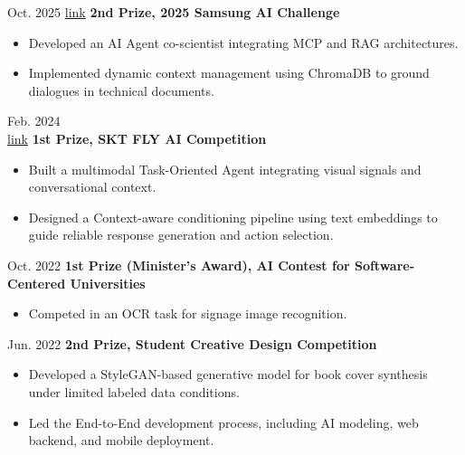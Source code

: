 \documentclass[10pt, letterpaper]{article}
\newenvironment{highlights}{
    \begin{itemize}[
        topsep=0.10 cm,
        parsep=0.10 cm,
        partopsep=0pt,
        itemsep=0pt,
        leftmargin=0.4 cm + 10pt
    ]
}{
    \end{itemize}
} %
\newenvironment{twocolentry_project}[2][]{
    \onecolentry
    \def\secondColumn{#2}
    \setcolumnwidth{\fill, 2.0 cm}
    \begin{paracol}{2}
}{
    \switchcolumn \raggedleft \secondColumn
    \end{paracol}
    \endonecolentry
} %
\let\hrefWithoutArrow\href
\renewcommand{\href}[2]{\hrefWithoutArrow{#1}{\ifthenelse{\equal{#2}{}}{ }{#2 }\raisebox{.15ex}{\footnotesize \faExternalLink*}}}
\begin{document}
    \begin{twocolentry_project}{
        Oct. 2025
        \hrefWithoutArrow{https://github.com/donguk071/AI-Coscientist}{\faLink link}
    }
        \textbf{2nd Prize, 2025 Samsung AI Challenge}
        \begin{highlights}
            \item Developed an AI Agent co-scientist integrating MCP and RAG architectures.
            \item Implemented dynamic context management using ChromaDB to ground dialogues in technical documents.
        \end{highlights}
    \end{twocolentry_project}

    \vspace{0.2 cm}

    \begin{twocolentry_project}{
        Feb. 2024\\
        \hrefWithoutArrow{https://github.com/donguk071/greedot}{\faLink link}
    }
        \textbf{1st Prize, SKT FLY AI Competition}
        \begin{highlights}
            \item Built a multimodal Task-Oriented Agent integrating visual signals and conversational context.
            \item Designed a Context-aware conditioning pipeline using text embeddings to guide reliable response generation and action selection.
        \end{highlights}
    \end{twocolentry_project}

    \vspace{0.2 cm}

    \begin{twocolentry_project}{
        Oct. 2022
    }
        \textbf{1st Prize (Minister’s Award), AI Contest for Software-Centered Universities}
        \begin{highlights}
            \item Competed in an OCR task for signage image recognition.
        \end{highlights}
    \end{twocolentry_project}

    \vspace{0.2 cm}
    \begin{twocolentry_project}{
        Jun. 2022
    }
        \textbf{2nd Prize, Student Creative Design Competition}
        \begin{highlights}
            \item Developed a StyleGAN-based generative model for book cover synthesis
            under limited labeled data conditions.      
            \item Led the End-to-End development process, including AI modeling, web backend, and mobile deployment.
        \end{highlights}
    \end{twocolentry_project}
\end{document}
